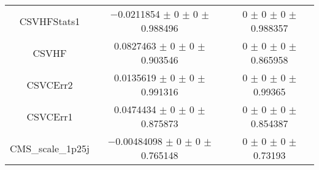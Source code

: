 \begin{table}
\begin{tabular}{ccc}
CSVHFStats1 	& \num{-0.0211854} $\pm$ \num{0} $\pm$ \num{0} $\pm$ \num{0.988496} 	& \num{0} $\pm$ \num{0} $\pm$ \num{0} $\pm$ \num{0.988357}\\
CSVHF 	& \num{0.0827463} $\pm$ \num{0} $\pm$ \num{0} $\pm$ \num{0.903546} 	& \num{0} $\pm$ \num{0} $\pm$ \num{0} $\pm$ \num{0.865958}\\
CSVCErr2 	& \num{0.0135619} $\pm$ \num{0} $\pm$ \num{0} $\pm$ \num{0.991316} 	& \num{0} $\pm$ \num{0} $\pm$ \num{0} $\pm$ \num{0.99365}\\
CSVCErr1 	& \num{0.0474434} $\pm$ \num{0} $\pm$ \num{0} $\pm$ \num{0.875873} 	& \num{0} $\pm$ \num{0} $\pm$ \num{0} $\pm$ \num{0.854387}\\
CMS\_scale\_1p25j 	& \num{-0.00484098} $\pm$ \num{0} $\pm$ \num{0} $\pm$ \num{0.765148} 	& \num{0} $\pm$ \num{0} $\pm$ \num{0} $\pm$ \num{0.73193}\\
\bottomrule
\end{tabular}
\end{table}